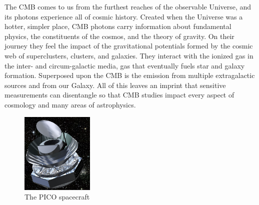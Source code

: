 \documentclass[PICOReport.tex]{subfiles}
\begin{document}

The \ac{CMB} comes to us from the furthest reaches of the observable Universe, and its photons experience all of cosmic history.  Created when the Universe was a hotter, simpler place, CMB photons carry information about fundamental physics, the constituents of the cosmos, and the theory of gravity.  On their journey they feel the impact of the gravitational potentials formed by the cosmic web of superclusters, clusters, and galaxies.  They interact with the ionized gas in the inter- and circum-galactic media, gas that eventually fuels star and galaxy formation.  Superposed upon the CMB is the emission from multiple extragalactic sources and from our Galaxy.  All of this leaves an imprint that sensitive measurements can disentangle so that CMB studies impact every aspect of cosmology and many areas of astrophysics.


\begin{figure}  %
\vspace{-5pt} %
\includegraphics[width=0.31\textwidth]{images/PICO_Image.jpg}
\vspace{-0.25in}
\caption{\captiontext The PICO spacecraft 
\label{fig:pico_rendered} }
\end{figure}
\end{document}
